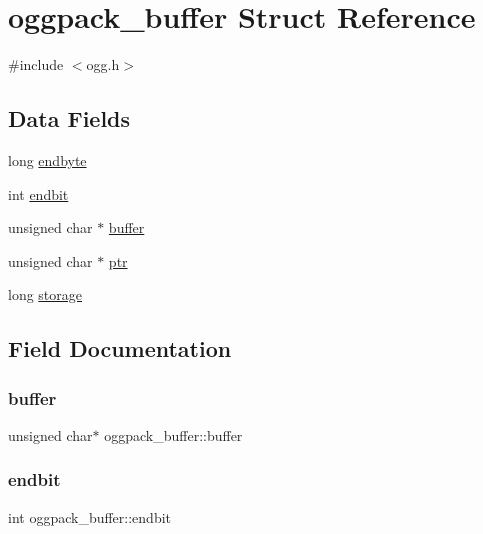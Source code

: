 \hypertarget{structoggpack__buffer}{}\section{oggpack\+\_\+buffer Struct Reference}
\label{structoggpack__buffer}


{\ttfamily \#include $<$ogg.\+h$>$}

\subsection*{Data Fields}
\begin{DoxyCompactItemize}
\item 
long \hyperlink{structoggpack__buffer_a416200dd77da3603dce3913826d74207}{endbyte}
\item 
int \hyperlink{structoggpack__buffer_a5a2ecb260025f73201e58dbd621c9f8b}{endbit}
\item 
unsigned char $\ast$ \hyperlink{structoggpack__buffer_a2d828a6e3d0a57f44debf56665ad402e}{buffer}
\item 
unsigned char $\ast$ \hyperlink{structoggpack__buffer_a479984d9646e0fba6da8aff21e5c3b64}{ptr}
\item 
long \hyperlink{structoggpack__buffer_a1eea2afb662c8080a902d224773fee4e}{storage}
\end{DoxyCompactItemize}


\subsection{Field Documentation}
\mbox{\label{structoggpack__buffer_a2d828a6e3d0a57f44debf56665ad402e}} 
\subsubsection{\texorpdfstring{buffer}{buffer}}
{\footnotesize\ttfamily unsigned char$\ast$ oggpack\+\_\+buffer\+::buffer}

\mbox{\label{structoggpack__buffer_a5a2ecb260025f73201e58dbd621c9f8b}} 
\subsubsection{\texorpdfstring{endbit}{endbit}}
{\footnotesize\ttfamily int oggpack\+\_\+buffer\+::endbit}

